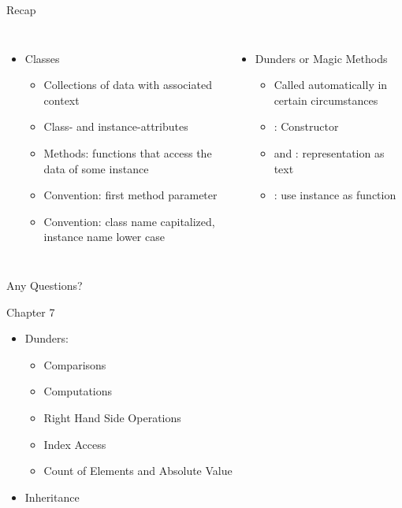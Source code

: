 
\begin{frame}[t,plain]
\titlepage
\end{frame}


\begin{frame}[fragile]{Recap}
%
\begin{columns}[T]
\begin{itemize}
\item Classes
	\begin{itemize}
	\item Collections of data with associated context
	\item Class- and instance-attributes
	\item Methods: functions that access the data of some instance
	\item Convention: first method parameter 
	\item Convention: class name capitalized, instance name lower case
	\end{itemize}
\end{itemize}
%
\begin{itemize}
\item Dunders or Magic Methods
	\begin{itemize}
	\item Called automatically in certain circumstances
	\item {}: Constructor
	\item {} and : representation as text
	\item {}: use instance as function
	\end{itemize}
\end{itemize}
\end{columns}
%
\begin{center}
Any Questions?
\end{center}
%
\end{frame}


\begin{frame}[fragile]{Chapter 7}
%
\begin{itemize}
\item Dunders: 
	\begin{itemize}
	\item Comparisons
	\item Computations
	\item Right Hand Side Operations
	\item Index Access
	\item Count of Elements and Absolute Value
	\end{itemize}
\item Inheritance
\end{itemize}
%
\end{frame}

